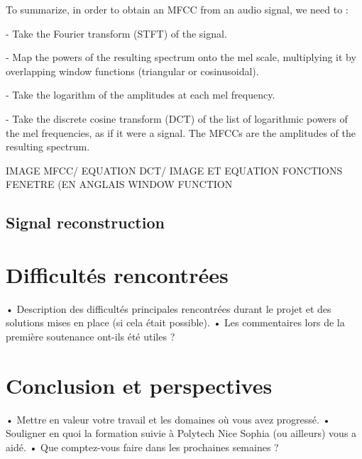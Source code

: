 \documentclass[11pt]{article}
\begin{document}
\begin{itemize}
To summarize, in order to obtain an MFCC from an audio signal, we need to :

- Take the Fourier transform (STFT) of the signal.

- Map the powers of the resulting spectrum onto the mel scale, multiplying it by overlapping window functions (triangular or cosinusoidal).

- Take the logarithm of the amplitudes at each mel frequency.

- Take the discrete cosine transform (DCT) of the list of logarithmic powers of the mel frequencies, as if it were a signal. The MFCCs are the amplitudes of the resulting spectrum.

IMAGE MFCC/ EQUATION DCT/ IMAGE ET EQUATION FONCTIONS FENETRE (EN ANGLAIS WINDOW FUNCTION
\end{itemize}


\subsection{Signal reconstruction}



\pagebreak


\section{Difficultés rencontrées}

•	Description des difficultés principales rencontrées durant le projet et des solutions mises en place (si cela était possible).
•	Les commentaires lors de la première soutenance ont-ils été utiles ?

\pagebreak

\section{Conclusion et perspectives}

•	Mettre en valeur votre travail et les domaines où vous avez progressé.
•	Souligner en quoi la formation suivie à Polytech Nice Sophia (ou ailleurs) vous a aidé.
•	Que comptez-vous faire dans les prochaines semaines ?

\pagebreak



\end{document}
